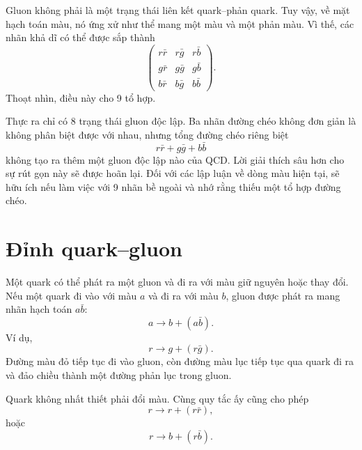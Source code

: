 Gluon không phải là một trạng thái liên kết quark--phản quark. Tuy vậy, về mặt hạch toán màu, nó ứng xử như thể mang một màu và một phản màu. Vì thế, các nhãn khả dĩ có thể được sắp thành
\begin{equation}
\begin{pmatrix}
r\bar r&r\bar g&r\bar b\\
g\bar r&g\bar g&g\bar b\\
b\bar r&b\bar g&b\bar b
\end{pmatrix}.
\end{equation}
Thoạt nhìn, điều này cho 9 tổ hợp.

\begin{classroomqa}
\end{classroomqa}

Thực ra chỉ có 8 trạng thái gluon độc lập. Ba nhãn đường chéo không đơn giản là không phân biệt được với nhau, nhưng tổng đường chéo riêng biệt
\begin{equation}
r\bar r+g\bar g+b\bar b
\end{equation}
không tạo ra thêm một gluon độc lập nào của QCD. Lời giải thích sâu hơn cho sự rút gọn này sẽ được hoãn lại. Đối với các lập luận về dòng màu hiện tại, sẽ hữu ích nếu làm việc với 9 nhãn bề ngoài và nhớ rằng thiếu một tổ hợp đường chéo.

\section{Đỉnh quark--gluon}

Một quark có thể phát ra một gluon và đi ra với màu giữ nguyên hoặc thay đổi. Nếu một quark đi vào với màu \(a\) và đi ra với màu \(b\), gluon được phát ra mang nhãn hạch toán \(a\bar b\):
\begin{equation}
a\longrightarrow b+(a\bar b).
\end{equation}
Ví dụ,
\begin{equation}
r\longrightarrow g+(r\bar g).
\end{equation}
Đường màu đỏ tiếp tục đi vào gluon, còn đường màu lục tiếp tục qua quark đi ra và đảo chiều thành một đường phản lục trong gluon.

Quark không nhất thiết phải đổi màu. Cùng quy tắc ấy cũng cho phép
\begin{equation}
r\longrightarrow r+(r\bar r),
\end{equation}
hoặc
\begin{equation}
r\longrightarrow b+(r\bar b).
\end{equation}

